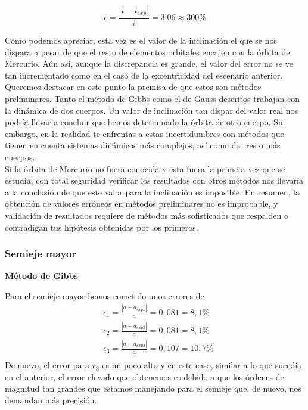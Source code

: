 \documentclass{article}
\numberwithin{equation}{section}
\begin{document}
\begin{equation*}
    \epsilon=\frac{\left\lvert i-i_{exp} \right\rvert}{i}=3.06\approx300\%
\end{equation*}

Como podemos apreciar, esta vez es el valor de la inclinación el que se nos dispara a pesar de que el resto de elementos orbitales encajen con la órbita de Mercurio. Aún así, aunque la discrepancia es grande, el valor del error no se ve tan incrementado como en el caso de la excentricidad del escenario anterior.\\

Queremos destacar en este punto la premisa de que estos son métodos preliminares. Tanto el método de Gibbs como el de Gauss descritos trabajan con la dinámica de dos cuerpos. Un valor de inclinación tan dispar del valor real nos podría llevar a concluir que hemos determinado la órbita de otro cuerpo. Sin embargo, en la realidad te enfrentas a estas incertidumbres con métodos que tienen en cuenta sistemas dinámicos más complejos, así como de tres o más cuerpos.\\

Si la órbita de Mercurio no fuera conocida y esta fuera la primera vez que se estudia, con total seguridad verificar los resultados con otros métodos nos llevaría a la conclusión de que este valor para la inclinación es imposible. En resumen, la obtención de valores erróneos en métodos preliminares no es improbable, y validación de resultados requiere de métodos más sofisticados que respalden o contradigan tus hipótesis obtenidas por los primeros.\\

\subsubsection{Semieje mayor}
\noindent\textbf{Método de Gibbs}\par
Para el semieje mayor hemos cometido unos errores de 
\begin{align*}
    &\epsilon_{1}=\frac{\left\lvert a-a_{exp1} \right\rvert }{a}=0,081=8,1\% \\
    &\epsilon_{2}=\frac{\left\lvert a-a_{exp2} \right\rvert }{a}=0,081=8,1\% \\
    &\epsilon_{3}=\frac{\left\lvert a-a_{exp3} \right\rvert }{a}=0,107=10,7\% \\
\end{align*}
De nuevo, el error para $r_{3}$ es un poco alto y en este caso, similar a lo que sucedía en el anterior, el error elevado que 
obtenemos es debido a que los órdenes de magnitud tan grandes 
que estamos manejando para el semieje que, de nuevo, nos 
demandan más precisión.\\
\end{document}
